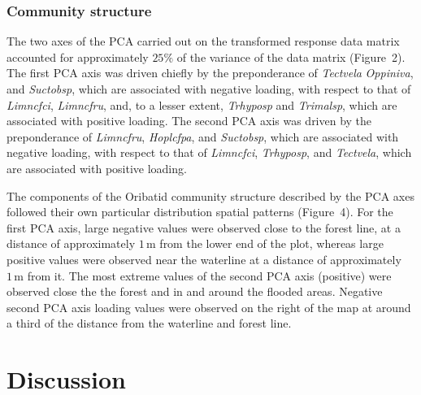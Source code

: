 \documentclass[
]{article}
\begin{document}
\subsubsection{Community structure}\label{community-structure}

The two axes of the PCA carried out on the transformed response data
matrix accounted for approximately \(25\%\) of the variance of the data
matrix (Figure~2). The first PCA axis was driven chiefly by the
preponderance of \emph{Tectvela} \emph{Oppiniva}, and \emph{Suctobsp},
which are associated with negative loading, with respect to that of
\emph{Limncfci}, \emph{Limncfru}, and, to a lesser extent,
\emph{Trhyposp} and \emph{Trimalsp}, which are associated with positive
loading. The second PCA axis was driven by the preponderance of
\emph{Limncfru}, \emph{Hoplcfpa}, and \emph{Suctobsp}, which are
associated with negative loading, with respect to that of
\emph{Limncfci}, \emph{Trhyposp}, and \emph{Tectvela}, which are
associated with positive loading.

The components of the Oribatid community structure described by the PCA
axes followed their own particular distribution spatial patterns
(Figure~4). For the first PCA axis, large negative values were observed
close to the forest line, at a distance of approximately
\(1\,\mathrm{m}\) from the lower end of the plot, whereas large positive
values were observed near the waterline at a distance of approximately
\(1\,\mathrm{m}\) from it. The most extreme values of the second PCA
axis (positive) were observed close the the forest and in and around the
flooded areas. Negative second PCA axis loading values were observed on
the right of the map at around a third of the distance from the
waterline and forest line.

\section{Discussion}\label{discussion}
\end{document}
